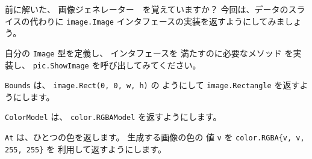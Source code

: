 前に解いた、 画像ジェネレーター　を覚えていますか？
今回は、データのスライスの代わりに \texttt{image.Image}
インタフェースの実装を返すようにしてみましょう。

自分の \texttt{Image} 型を定義し、 インタフェースを
満たすのに必要なメソッド を実装し、 \texttt{pic.ShowImage}
を呼び出してみてください。

\texttt{Bounds} は、 \texttt{image.Rect(0, 0, w, h)} の
ようにして \texttt{image.Rectangle} を返すようにします。

\texttt{ColorModel} は、 \texttt{color.RGBAModel} を返すようにします。

\texttt{At} は、ひとつの色を返します。 生成する画像の色の
値 \texttt{v} を \texttt{color.RGBA\{v, v, 255, 255\}} を
利用して返すようにします。
